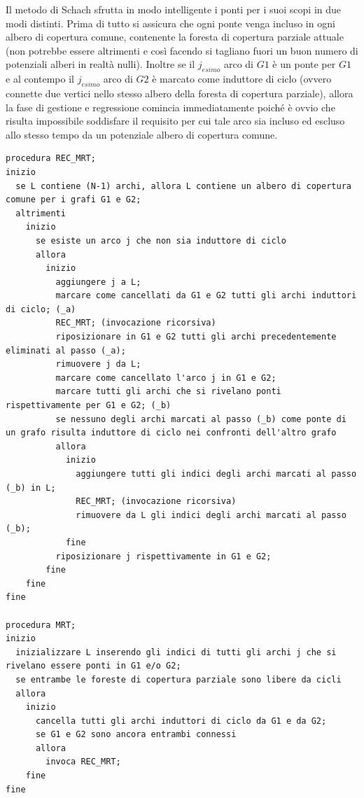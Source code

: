 Il metodo di Schach sfrutta in modo intelligente i ponti per i suoi scopi in due modi distinti. Prima di tutto si assicura che ogni ponte venga incluso in ogni albero di copertura comune, contenente la foresta di copertura parziale attuale (non potrebbe essere altrimenti e così facendo si tagliano fuori un buon numero di potenziali alberi in realtà nulli). Inoltre se il $j_{esimo}$ arco di $G1$ è un ponte per $G1$ e al contempo il $j_{esimo}$ arco di $G2$ è marcato come induttore di ciclo (ovvero connette due vertici nello stesso albero della foresta di copertura parziale), allora la fase di gestione e regressione comincia immediatamente poiché è ovvio che risulta impossibile soddisfare il requisito per cui tale arco sia incluso ed escluso allo stesso tempo da un potenziale albero di copertura comune.

\begin{lstlisting}[float, frame=shadowbox, framexleftmargin=3mm, caption=Algoritmo MRT, captionpos=t, label=lst:MRT]
procedura REC_MRT;
inizio
  se L contiene (N-1) archi, allora L contiene un albero di copertura comune per i grafi G1 e G2;
  altrimenti
    inizio
      se esiste un arco j che non sia induttore di ciclo
      allora
        inizio
          aggiungere j a L;
          marcare come cancellati da G1 e G2 tutti gli archi induttori di ciclo; (_a)
          REC_MRT; (invocazione ricorsiva)
          riposizionare in G1 e G2 tutti gli archi precedentemente eliminati al passo (_a);
          rimuovere j da L;
          marcare come cancellato l'arco j in G1 e G2;
          marcare tutti gli archi che si rivelano ponti rispettivamente per G1 e G2; (_b)
          se nessuno degli archi marcati al passo (_b) come ponte di un grafo risulta induttore di ciclo nei confronti dell'altro grafo
          allora
            inizio
              aggiungere tutti gli indici degli archi marcati al passo (_b) in L;
              REC_MRT; (invocazione ricorsiva)
              rimuovere da L gli indici degli archi marcati al passo (_b);
            fine
          riposizionare j rispettivamente in G1 e G2;
        fine
    fine
fine

procedura MRT;
inizio
  inizializzare L inserendo gli indici di tutti gli archi j che si rivelano essere ponti in G1 e/o G2;
  se entrambe le foreste di copertura parziale sono libere da cicli
  allora
    inizio
      cancella tutti gli archi induttori di ciclo da G1 e da G2;
      se G1 e G2 sono ancora entrambi connessi
      allora
        invoca REC_MRT;
    fine
fine
\end{lstlisting}

